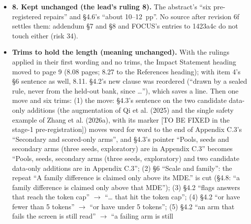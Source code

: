 \documentclass{article}
\theoremstyle{plain}
\theoremstyle{definition}
\theoremstyle{remark}
\begin{document}
\begin{itemize}
        at the end of ``undetermined'', so the LaTeX printed a stray asterisk
        and set the rest of the title and ``undetermined'' in the wrong style.
        Fix: that asterisk is escaped in the Markdown, and the converter keeps
        an escaped asterisk literal (one new rule; on revision 6f's notes it
        changes nothing but its header comment). The HTML from the Markdown was
        already right. A check of the regenerated Appendix B (every
        \texttt{\textbackslash{}emph} span, and every asterisk outside math)
        finds no other unbalanced emphasis; the long emphasis spans left are the
        alternative titles and the ``History'' lines, as intended.
  \item \textbf{8. Kept unchanged (the lead's ruling 8).} The abstract's ``six
        pre-registered repairs'' and \S{}4.6's ``about 10--12~pp''. No source
        after revision 6f settles them: addendum \S{}7 and \S{}8 and FOCUS's
        entries to 1423a4c do not touch either (risk 34).
  \item \textbf{Trims to hold the length (meaning unchanged).} With the rulings
        applied in their first wording and no trims, the Impact Statement
        heading moved to page 9 (8.08 pages; 8.27 to the References heading);
        with item 4's \S{}6 sentence as well, 8.11. \S{}4.2's new clause was
        reordered (``drawn by a sealed rule, never from the held-out bank, since
        \ldots{}''), which saves a line. Then one move and six trims: (1) the
        move: \S{}4.3's sentence on the two candidate data-only additions (the
        augmentation of Qi et al. (2025) and the single safety example of Zhang
        et al. (2026a), with its marker [TO BE FIXED in the stage-1
        pre-registration]) moves word for word to the end of Appendix C.3's
        ``Secondary and scored-only arms'', and \S{}4.3's pointer ``Pools, seeds
        and secondary arms (three seeds, exploratory) are in Appendix C.3''
        becomes ``Pools, seeds, secondary arms (three seeds, exploratory) and
        two candidate data-only additions are in Appendix C.3''; (2) \S{}6
        ``Scale and family'': the repeat ``A family difference is claimed only
        above its MDE.'' is cut (\S{}4.8: ``a family difference is claimed only
        above that MDE''); (3) \S{}4.2 ``flags answers that reach the token
        cap'' $\to$ ``\ldots{} that hit the token cap''; (4) \S{}4.2 ``or have
        fewer than 5 tokens'' $\to$ ``or have under 5 tokens''; (5) \S{}4.2 ``an
        arm that fails the screen is still read'' $\to$ ``a failing arm is still

\end{itemize}
\end{document}
